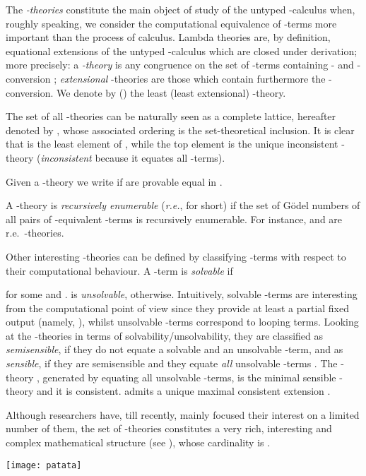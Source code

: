\documentclass[english]{llncs}
\begin{document}
The \emph{-theories} constitute the main object of study of the untyped -calculus when, roughly speaking, we consider the computational equivalence of -terms more important than the process of calculus. 
Lambda theories are, by definition, equational extensions of the untyped -calculus which are closed under derivation; more precisely: 
a {\em -theory} is any congruence on the set  of -terms containing - and -conversion \cite[Def.~4.1.1]{Bare}; 
\emph{extensional} -theories are those which contain furthermore the -conversion. 
We denote by  () the least (least extensional) -theory. 

The set of all -theories can be naturally seen as a complete lattice, hereafter denoted by , whose associated ordering is the set-theoretical inclusion.
It is clear that  is the least element of , while the top element is the unique inconsistent -theory  
({\em inconsistent} because it equates all -terms).

Given a -theory  we write  if  are provable equal in .

A -theory  is {\em recursively enumerable} ({\em r.e.}, for short) if the set of G\"odel numbers of all pairs of -equivalent -terms
is recursively enumerable. For instance,  and  are r.e.\ -theories.

Other interesting -theories can be defined by classifying -terms with respect to their computational behaviour. 
A -term  is {\em solvable} if 
 
for some  and .
 is {\em unsolvable}, otherwise. 
Intuitively, solvable -terms are interesting from the computational point of view since they provide at least a partial fixed output 
(namely, ), 
whilst unsolvable -terms correspond to looping terms.
Looking at the -theories in terms of solvability/unsolvability, they are classified as \emph{semisensible}, if they do not equate a solvable and an unsolvable -term, and as \emph{sensible}, if they are semisensible and they equate \emph{all} unsolvable -terms \cite[Sec.~16, 17]{Bare}.
The -theory , generated by equating all unsolvable -terms, is the minimal sensible -theory and it is consistent.
 admits a unique maximal consistent extension .

Although researchers have, till recently, mainly focused their interest on a limited number of them, the set of -theories
constitutes a very rich, interesting and complex mathematical structure (see \cite{Bare,Berline00,Berline06}), whose cardinality is .

\begin{center}
\vspace*{1ex}
\ifx\pdfoutput\undefined
{}
\else
\texttt{[image: patata]}
\fi 
\vspace*{1ex}
\end{center}
\end{document}
